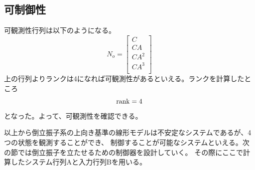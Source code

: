 	\subsection{可制御性}
		可観測性行列は以下のようになる。
		\begin{equation}
			N_{o} = \left[
			\begin{array}{c}
				C\\
				CA\\
				CA^{2}\\
				CA^{3}\\
			\end{array}
			\right]
		\end{equation}
		上の行列よりランクは4になれば可観測性があるといえる。ランクを計算したところ
		\begin{equation}
			\rm{rank} = 4
		\end{equation}
		となった。よって、可観測性を確認できる。\\
	\par
	以上から倒立振子系の上向き基準の線形モデルは不安定なシステムであるが、4つの状態を観測することができ、
	制御することが可能なシステムといえる。次の節では倒立振子を立たせるための制御器を設計していく。
	その際にここで計算したシステム行列Aと入力行列Bを用いる。
		
